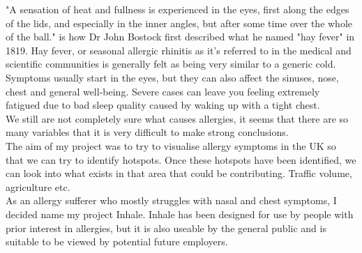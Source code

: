"A sensation of heat and fullness is experienced in the eyes, first along the edges of the lids, and especially in the inner angles, but after some time over the whole of the ball." is how Dr John Bostock first described what he named "hay fever" in 1819. Hay fever, or seasonal allergic rhinitis as it's referred to in the medical and scientific communities is generally felt as being very similar to a generic cold. Symptoms usually start in the eyes, but they can also affect the sinuses, nose, chest and general well-being. Severe cases can leave you feeling extremely fatigued due to bad sleep quality caused by waking up with a tight chest.\\

We still are not completely sure what causes allergies, it seems that there are so many variables that it is very difficult to make strong conclusions.\\

The aim of my project was to try to visualise allergy symptoms in the UK so that we can try to identify hotspots. Once these hotspots have been identified, we can look into what exists in that area that could be contributing. Traffic volume, agriculture etc.\\

As an allergy sufferer who mostly struggles with nasal and chest symptoms, I decided name my project Inhale. Inhale has been designed for use by people with prior interest in allergies, but it is also useable by the general public and is suitable to be viewed by potential future employers.